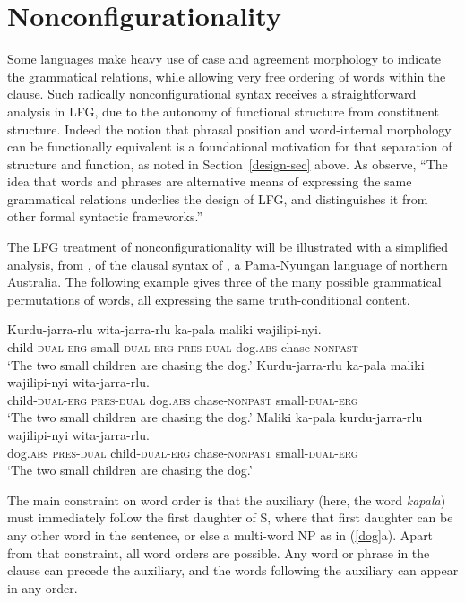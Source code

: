 \section{Nonconfigurationality}
\label{nonconfig-sec}
Some languages make heavy use of case and agreement morphology to indicate the grammatical relations, while allowing very free ordering of words within the clause.  Such radically nonconfigurational syntax receives a straightforward analysis in LFG, due to the autonomy of functional structure from constituent structure.  Indeed the notion that phrasal position and word-internal morphology can be functionally equivalent is a foundational motivation for that separation of structure and function, as noted in Section~\ref{design-sec} above.  As \citet[5]{BATW2016a} observe, ``The idea that words and phrases are alternative means of expressing the
same grammatical relations underlies the design of LFG, and distinguishes it from other formal syntactic frameworks.''  

The LFG treatment of nonconfigurationality will be illustrated with a simplified analysis, from \citet[352--353]{BATW2016a}, of the clausal syntax of , a Pama-Nyungan language of northern Australia.  The following example gives three of the many possible grammatical permutations of words, all expressing the same truth-conditional content.

 \begin{exe} 
\ex	\label{dog}
\begin{xlist}
\ex 
\gll Kurdu-jarra-rlu wita-jarra-rlu ka-pala maliki wajilipi-nyi. \\
child-\textsc{dual-erg} small-\textsc{dual-erg} \textsc{pres-dual}
dog.\textsc{abs} chase-\textsc{nonpast}\\
\glt `The two small children are chasing the dog.' 
\ex 
\gll Kurdu-jarra-rlu ka-pala maliki wajilipi-nyi wita-jarra-rlu. \\
child-\textsc{dual-erg}  \textsc{pres-dual}
dog.\textsc{abs} chase-\textsc{nonpast} small-\textsc{dual-erg}\\
\glt `The two small children are chasing the dog.' 
\ex 
\gll Maliki ka-pala  kurdu-jarra-rlu wajilipi-nyi wita-jarra-rlu. \\
dog.\textsc{abs} \textsc{pres-dual} child-\textsc{dual-erg} chase-\textsc{nonpast} small-\textsc{dual-erg} 
\\
\glt `The two small children are chasing the dog.' 
\end{xlist}
\end{exe}
The main constraint on word order is that the auxiliary (here, the word \textit{kapala}) must immediately follow the first daughter of S, where that first daughter can be any other word in the sentence, or else a multi-word NP as in (\ref{dog}a).  Apart from that constraint, all word orders are possible.  Any word or phrase in the clause can precede the auxiliary, and the words following the auxiliary can appear in any order. 

